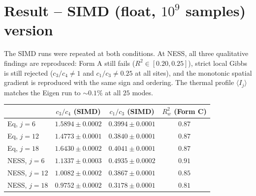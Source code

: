 \documentclass[11pt]{article}
\begin{document}
\section*{Result -- SIMD (float, $10^9$ samples) version}
The SIMD runs were repeated at both conditions. At NESS, all three
qualitative findings are reproduced: Form A still fails
($R^2 \in [0.20, 0.25]$), strict local Gibbs is still rejected
($c_3/c_4 \neq 1$ and $c_1/c_3 \neq 0.25$ at all sites), and the
monotonic spatial gradient is reproduced with the same sign and
ordering. The thermal profile $\langle I_j\rangle$ matches the Eigen
run to $\sim 0.1\%$ at all $25$ modes.

\begin{center}
\begin{tabular}{lccc}
\toprule
 & $c_3/c_4$ (SIMD) & $c_1/c_3$ (SIMD) & $R^2_w$ (Form C) \\
\midrule
Eq, $j=6$  & $1.5894 \pm 0.0002$ & $0.3994 \pm 0.0001$ & $0.87$ \\
Eq, $j=12$ & $1.4773 \pm 0.0001$ & $0.3840 \pm 0.0001$ & $0.87$ \\
Eq, $j=18$ & $1.6430 \pm 0.0002$ & $0.4041 \pm 0.0001$ & $0.87$ \\[2pt]
NESS, $j=6$  & $1.1337 \pm 0.0003$ & $0.4935 \pm 0.0002$ & $0.91$ \\
NESS, $j=12$ & $1.0082 \pm 0.0002$ & $0.3867 \pm 0.0001$ & $0.85$ \\
NESS, $j=18$ & $0.9752 \pm 0.0002$ & $0.3178 \pm 0.0001$ & $0.81$ \\
\bottomrule
\end{tabular}
\end{center}
\end{document}

